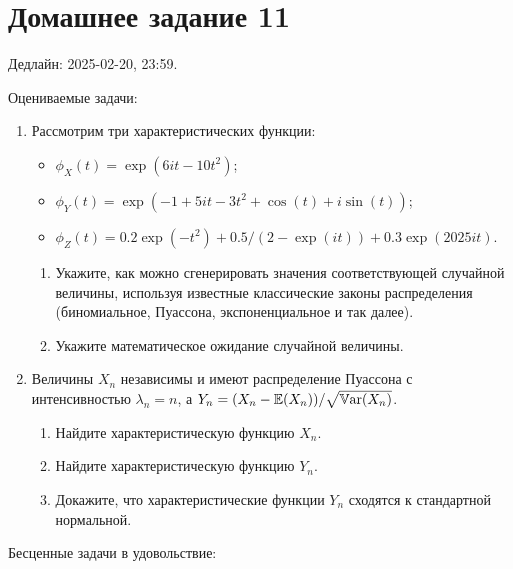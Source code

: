 \section*{Домашнее задание 11}


Дедлайн: 2025-02-20, 23:59.

Оцениваемые задачи:

\begin{enumerate}

    
\item Рассмотрим три характеристических функции:
\begin{itemize}
    \item $\phi_X(t) = \exp(6it - 10t^2)$;
    \item $\phi_Y(t) = \exp(-1 + 5it - 3t^2 + \cos(t) + i \sin (t))$;
    \item $\phi_Z(t) = 0.2 \exp(-t^2) + 0.5 / (2 - \exp(it)) + 0.3 \exp(2025it)$.
\end{itemize}
\begin{enumerate}
    \item Укажите, как можно сгенерировать значения соответствующей случайной величины, используя известные классические законы распределения (биномиальное, Пуассона, экспоненциальное и так далее).
    \item Укажите математическое ожидание случайной величины. 
\end{enumerate}

\item Величины $X_n$ независимы и имеют распределение Пуассона с интенсивностью $\lambda_n = n$, а $Y_n = (X_n - \operatorname{\mathbb{E}}(X_n)) / \sqrt{\operatorname{\mathbb{V}ar}(X_n)}$.
\begin{enumerate}
    \item Найдите характеристическую функцию $X_n$.
    \item Найдите характеристическую функцию $Y_n$.
    \item Докажите, что характеристические функции $Y_n$ сходятся к стандартной нормальной. 
\end{enumerate}


\end{enumerate}

Бесценные задачи в удовольствие:

